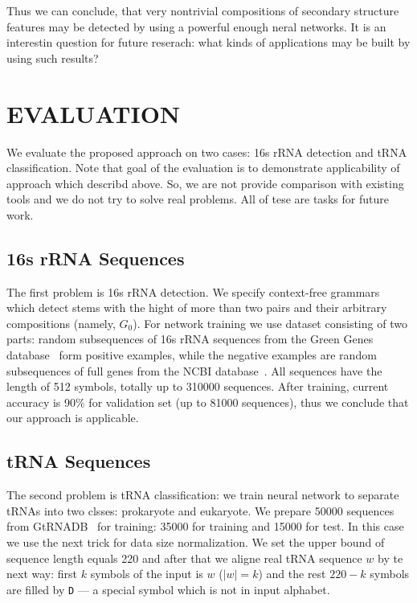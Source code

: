 \documentclass[a4paper,twoside]{article}
\begin{document}
Thus we can conclude, that very nontrivial compositions of secondary structure features may be detected by using a powerful enough neral networks.
It is an interestin question for future reserach: what kinds of applications may be built by using such results?


\section{\uppercase{Evaluation}}
\label{sec:evaluation}

\noindent We evaluate the proposed approach on two cases: 16s rRNA detection and tRNA classification.
Note that goal of the evaluation is to demonstrate applicability of approach which describd above.
So, we are not provide comparison with existing tools and we do not try to solve real problems.
All of tese are tasks for future work.

\subsection{16s rRNA Sequences}
\noindent The first problem is 16s rRNA detection.
We specify context-free grammars which detect stems with the hight of more than two pairs and their arbitrary compositions (namely, $G_0$).
For network training we use dataset consisting of two parts: random subsequences of 16s rRNA sequences from the Green Genes database~\cite{pmid16820507} form positive examples, while the negative examples are random subsequences of full genes from the NCBI database~\cite{pmid19854944}.
All sequences have the length of 512 symbols, totally up to 310000 sequences.
After training, current accuracy is 90\% for validation set (up to 81000 sequences), thus we conclude that our approach is applicable.

\subsection{tRNA Sequences}

\noindent The second problem is tRNA classification: we train neural network to separate tRNAs into two clsses: prokaryote and eukaryote.
We prepare 50000 sequences from GtRNADB~\cite{Chan2009} for training: 35000 for training and 15000 for test.
In this case we use the next trick for data size normalization.
We set the upper bound of sequence length equals 220 and after that we aligne real tRNA sequence $w$ by te next way: first $k$ symbols of the input is $w$ ($|w|=k$) and the rest $220-k$ symbols are filled by \verb|D| --- a special symbol which is not in input alphabet.
\end{document}
